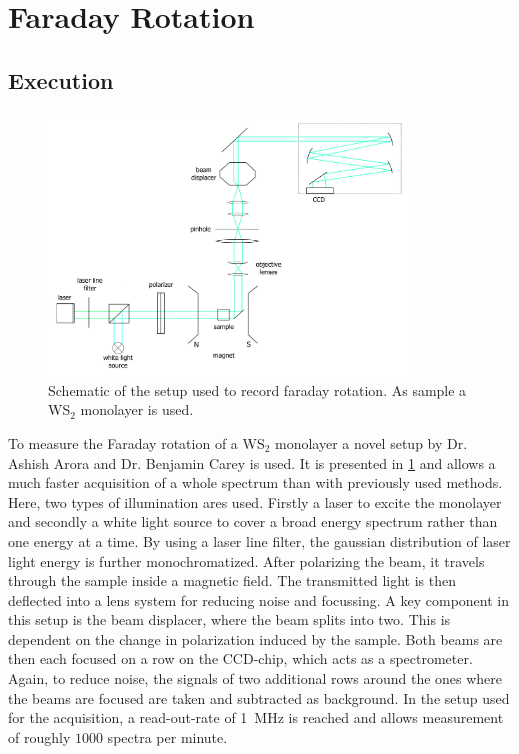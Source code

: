 \newpage
\section{Faraday Rotation}

\subsection{Execution}

\begin{figure}[!ht]
    \centering
    \includegraphics[width=0.85\textwidth]{img/setup3.png}
    \caption{Schematic of the setup used to record faraday rotation. As sample a WS$_2$ monolayer is used.}
    \label{fig_setup3}
\end{figure}
To measure the Faraday rotation of a WS$_2$ monolayer a novel setup by Dr. Ashish Arora and Dr. Benjamin Carey is used.
It is presented in \cref{fig_setup3} and allows a much faster acquisition of a whole spectrum than with previously used methods.
Here, two types of illumination ares used.
Firstly a laser to excite the monolayer and secondly a white light source to cover a broad energy spectrum rather than one energy at a time.
By using a laser line filter, the gaussian distribution of laser light energy is further monochromatized.
After polarizing the beam, it travels through the sample inside a magnetic field.
The transmitted light is then deflected into a lens system for reducing noise and focussing.
A key component in this setup is the beam displacer, where the beam splits into two.
This is dependent on the change in polarization induced by the sample.
Both beams are then each focused on a row on the CCD-chip, which acts as a spectrometer.
Again, to reduce noise, the signals of two additional rows around the ones where the beams are focused are taken and subtracted as background.
In the setup used for the acquisition, a read-out-rate of \SI{1}{\mega\hertz} is reached and allows measurement of roughly $1000$ spectra per minute.

